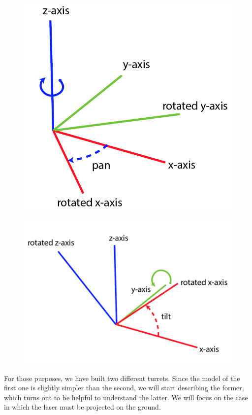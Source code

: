 \begin{figure}
\centering
\begin{minipage}{.5\textwidth}
  \centering
  \includegraphics[width=.5\linewidth]{img/pan.png}
  \label{fig:pan}
\end{minipage}%
\begin{minipage}{.5\textwidth}
  \centering
  \includegraphics[width=.6\linewidth]{img/tilt.png}
  \label{fig:tilt}
\end{minipage}
\end{figure}
For those purposes, we have built two different turrets. Since the model of the first one is slightly simpler than the second, we will start describing the former, which turns out to be helpful to understand the latter. We will focus on the case in which the laser must be projected on the ground.

